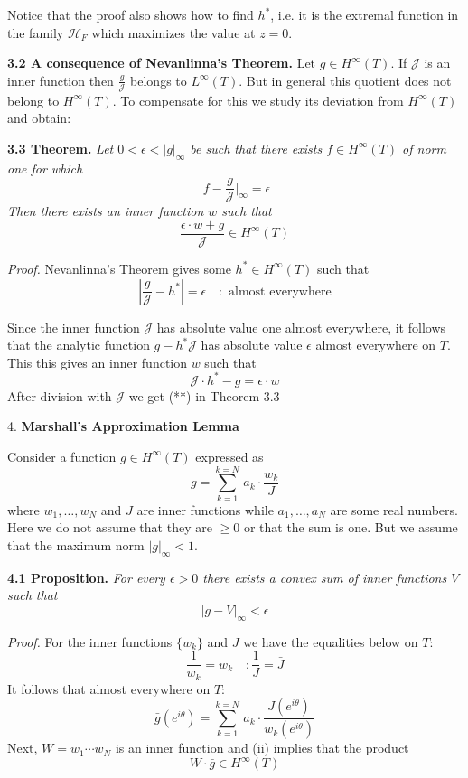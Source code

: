 \documentclass{amsart}
\def\uuu{_}
\begin{document}
 Notice that the proof also shows how to find
$h^*$, i.e. it is  the extremal function in the family $\mathcal H_F$ 
which maximizes the value at $z=0$.




\bigskip






\noindent
{\bf 3.2 A consequence of Nevanlinna's Theorem.}
Let 
$g\in H^\infty(T)$. If 
$\mathcal J$ is an inner function then
$\frac{g}{\mathcal J}$
belongs to $L^\infty(T)$.
But in general this quotient does not belong to
$H^\infty(T)$.
To compensate for this we study its deviation from
$H^\infty(T)$ and obtain:
\bigskip

\noindent
{\bf 3.3 Theorem.} \emph{Let  $0<\epsilon<|g|_\infty$ be such that
there exists $f\in H^\infty(T)$
of norm one for which}
\[
\bigl |f-\frac{g}{\mathcal J}\bigr |_\infty=\epsilon\tag{*}
\]
\emph{Then there exists an inner function $w$ such that}
\[
\frac{\epsilon\cdot w+g}{\mathcal J}\in H^\infty(T)\tag{**}
\]
\medskip

\noindent
\emph{Proof.}
Nevanlinna's Theorem gives some
$h^*\in H^\infty(T)$
such that
\[ 
|\frac{g}{\mathcal J}-h^*|=\epsilon \quad\colon\,\, \text{almost everywhere}
\]
\medskip


\noindent
Since the inner function $\mathcal J$ has absolute value one
almost everywhere, it follows that
the analytic function $g-h^*\mathcal J$
has absolute value $\epsilon$ almost everywhere on
$T$.
This  this gives an inner function $w$ such that
\[
\mathcal J\cdot h^*-g=\epsilon\cdot w\tag{iii}
\]
After division with
$\mathcal J$ we get (**) in Theorem 3.3

\newpage




\centerline{4. \bf{Marshall's Approximation Lemma}}

\bigskip
Consider  a  function $g\in H^\infty(T)$
expressed as
\[ 
g=\sum_{k=1}^{k=N}\, a_k\cdot \frac{w_k}{J}\tag{*}
\]
where $w_1,\ldots,w_N$ and $J$ 
are inner functions while 
$a_1,\ldots,a_N$ are some real numbers. Here we do not assume that
they are $\geq 0$ or that the sum is one. But we assume that
the maximum norm
$|g|_\infty<1$. 
\medskip

\noindent
{\bf 4.1 Proposition.} \emph{For every
$\epsilon>0$ there exists a convex
sum of inner
functions $V$ such that}
\[ 
\bigl|g-V\bigr|_\infty<\epsilon
\]



\noindent
\emph{Proof.}
For the inner functions $\{w\uuu k\}$ and
$J$
we have the equalities below on $T$:
\[
\frac{1}{w_k}=\bar w_k\quad\colon \frac{1}{J}=\bar J\tag{i}
\]
It follows that almost everywhere on $T$:
\[ 
\bar g(e^{i\theta})=\sum_{k=1}^{k=N}\, a_k\cdot \frac{J(e^{i\theta})}{ w_k
(e^{i\theta})}\tag{ii}
\]
Next, $W=w_1\cdots w_N$ is an inner function and (ii)
implies that the product 
\[
W\cdot \bar g\in H^\infty(T)\tag{iii}
\]
\end{document}
